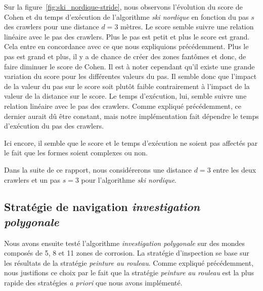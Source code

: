\documentclass[english,RandD]{rapportPFE}  %
\begin{document}
			Sur la figure~\ref{fig:ski_nordique-stride}, nous observons l'évolution du score de Cohen et du temps d'exécution de l'algorithme \textit{ski nordique} en fonction du pas $s$ des crawlers pour une distance $d = 3$ mètres.
			Le score semble suivre une relation linéaire avec le pas des crawlers.
			Plus le pas est petit et plus le score est grand.
			Cela entre en concordance avec ce que nous expliquions précédemment.
			Plus le pas est grand et plus, il y a de chance de créer des zones fantômes et donc, de faire diminuer le score de Cohen.
			Il est à noter cependant qu'il existe une grande variation du score pour les différentes valeurs du pas.
			Il semble donc que l'impact de la valeur du pas sur le score soit plutôt faible contrairement à l'impact de la valeur de la distance sur le score.
			Le temps d'exécution, lui, semble suivre une relation linéaire avec le pas des crawlers.
			Comme expliqué précédemment, ce dernier aurait dû être constant, mais notre implémentation fait dépendre le temps d'exécution du pas des crawlers.

			Ici encore, il semble que le score et le temps d'exécution ne soient pas affectés par le fait que les formes soient complexes ou non.

			Dans la suite de ce rapport, nous considérerons une distance $d = 3$ entre les deux crawlers et un pas $s = 3$ pour l'algorithme \textit{ski nordique}.
		\subsection*{Stratégie de navigation \textit{investigation polygonale}}
			Nous avons ensuite testé l'algorithme \textit{investigation polygonale} sur des mondes composés de 5, 8 et 11 zones de corrosion.
			La stratégie d'inspection se base sur les résultats de la stratégie \textit{peinture au rouleau}.
			Comme expliqué précédemment, nous justifions ce choix par le fait que la stratégie \textit{peinture au rouleau} est la plus rapide des stratégies \textit{a priori} que nous avons implémenté.
\end{document}
